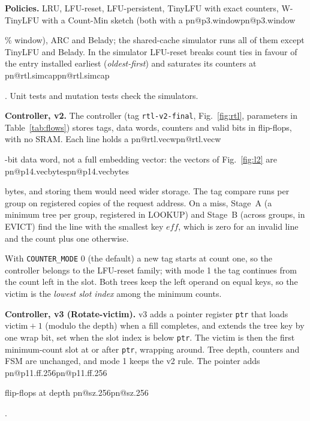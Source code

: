 \documentclass[conference,10pt]{IEEEtran}
\makeatletter
\newcommand{\R}[1]{\ifcsname pn@#1\endcsname\csname pn@#1\endcsname\else
  \PackageError{paper}{number key '#1' is not defined in macros.tex}{Run tools/make_paper_macros.py}\fi}
\makeatother
\begin{document}
\textbf{Policies.} LRU, LFU-reset, LFU-persistent, TinyLFU with exact counters, W-TinyLFU with a Count-Min sketch
(both with a \R{p3.window}\% window), ARC and Belady; the shared-cache simulator runs all of them except TinyLFU and
Belady. In the simulator LFU-reset breaks count ties in favour of the entry installed earliest (\emph{oldest-first})
and saturates its counters at \R{rtl.simcap}. Unit tests and mutation tests check the simulators.

\textbf{Controller, v2.} The controller (tag \texttt{rtl-v2-final}, Fig.~\ref{fig:rtl}, parameters in
Table~\ref{tab:flows}) stores tags, data words, counters and valid bits in flip-flops, with no SRAM. Each line holds
a \R{rtl.vecw}-bit data word, not a full embedding vector: the vectors of Fig.~\ref{fig:l2} are \R{p14.vecbytes}
bytes, and storing them would need wider storage. The tag compare runs per group on registered copies of the request
address. On a miss, Stage~A (a minimum tree per group, registered in LOOKUP) and Stage~B (across groups, in EVICT)
find the line with the smallest key $\mathit{eff}$, which is zero for an invalid line and the count plus one
otherwise.

With \texttt{COUNTER\_MODE} 0 (the default) a new tag starts at count one, so the controller belongs to the LFU-reset
family; with mode 1 the tag continues from the count left in the slot. Both trees keep the left operand on equal
keys, so the victim is the \emph{lowest slot index} among the minimum counts.

\textbf{Controller, v3 (Rotate-victim).} v3 adds a pointer register \texttt{ptr} that loads victim${}+1$ (modulo the
depth) when a fill completes, and extends the tree key by one wrap bit, set when the slot index is below
\texttt{ptr}. The victim is then the first minimum-count slot at or after \texttt{ptr}, wrapping around. Tree depth,
counters and FSM are unchanged, and mode 1 keeps the v2 rule. The pointer adds \R{p11.ff.256} flip-flops at depth
\R{sz.256}.
\end{document}
